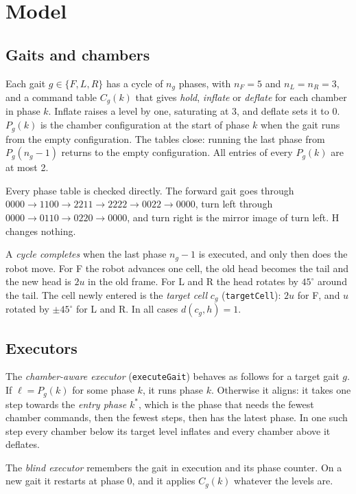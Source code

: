 \documentclass[11pt,a4paper]{article}
\theoremstyle{definition}
\begin{document}
\section{Model}

\subsection{Gaits and chambers}

Each gait $g\in\{F,L,R\}$ has a cycle of $n_g$ phases, with $n_F=5$ and $n_L=n_R=3$, and a command table $C_g(k)$ that gives \emph{hold}, \emph{inflate} or \emph{deflate} for each chamber in phase $k$. Inflate raises a level by one, saturating at 3, and deflate sets it to 0. $P_g(k)$ is the chamber configuration at the start of phase $k$ when the gait runs from the empty configuration. The tables close: running the last phase from $P_g(n_g-1)$ returns to the empty configuration. All entries of every $P_g(k)$ are at most 2.

Every phase table is checked directly. The forward gait goes through $0000\to1100\to2211\to2222\to0022\to0000$, turn left through $0000\to0110\to0220\to0000$, and turn right is the mirror image of turn left. H changes nothing.

A \emph{cycle completes} when the last phase $n_g-1$ is executed, and only then does the robot move. For F the robot advances one cell, the old head becomes the tail and the new head is $2u$ in the old frame. For L and R the head rotates by $45^\circ$ around the tail. The cell newly entered is the \emph{target cell} $c_g$ (\texttt{targetCell}): $2u$ for F, and $u$ rotated by $\pm45^\circ$ for L and R. In all cases $d(c_g,h)=1$.

\subsection{Executors}

The \emph{chamber-aware executor} (\texttt{executeGait}) behaves as follows for a target gait $g$. If $\ell=P_g(k)$ for some phase $k$, it runs phase $k$. Otherwise it aligns: it takes one step towards the \emph{entry phase} $k^*$, which is the phase that needs the fewest chamber commands, then the fewest steps, then has the latest phase. In one such step every chamber below its target level inflates and every chamber above it deflates.

The \emph{blind executor} remembers the gait in execution and its phase counter. On a new gait it restarts at phase 0, and it applies $C_g(k)$ whatever the levels are.
\end{document}
